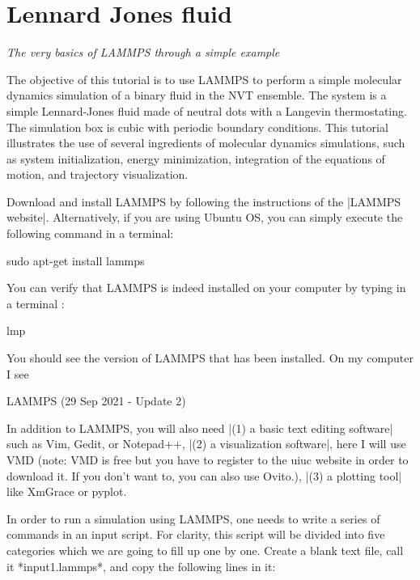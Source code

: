 \chapter{Lennard Jones fluid}
\label{lennard-jones-label}

\vspace{-1cm} \noindent \textcolor{graytitle}{\textit{{\Large The very basics of LAMMPS through a simple example}}\vspace{0.5cm} }

The objective of this tutorial is to use
LAMMPS to perform a simple molecular dynamics simulation
of a binary fluid in the NVT ensemble. The system is a simple Lennard-Jones fluid
made of neutral dots with a Langevin thermostating. The
simulation box is cubic with periodic boundary conditions.
This tutorial illustrates the use of several ingredients of
molecular dynamics simulations, such as system initialization,
energy minimization, integration of the equations of motion,
and trajectory visualization.

Download and install LAMMPS by following the instructions of the |LAMMPS website|.
Alternatively, if you are using Ubuntu OS, you can simply execute the
following command in a terminal:

\begin{lcverbatim}
sudo apt-get install lammps
\end{lcverbatim}

You can verify that LAMMPS is indeed installed on your
computer by typing in a terminal :

\begin{lcverbatim}
lmp
\end{lcverbatim}

You should see the version of LAMMPS that has been
installed. On my computer I see

\begin{lcverbatim}
LAMMPS (29 Sep 2021 - Update 2)
\end{lcverbatim}

In addition to LAMMPS, you will also need |(1) a basic text editing software|
such as Vim, Gedit, or Notepad++, |(2) a visualization software|, here I
will use VMD (note: VMD is free but you have to register to
the uiuc website in order to download it. If you don't want
to, you can also use Ovito.), |(3) a plotting tool| like
XmGrace or pyplot.

In order to run a simulation using LAMMPS, one needs to
write a series of commands in an input script. For clarity,
this script will be divided into five categories which we are going to
fill up one by one. Create a blank text file, call it
*input1.lammps*, and copy the following lines in it:

